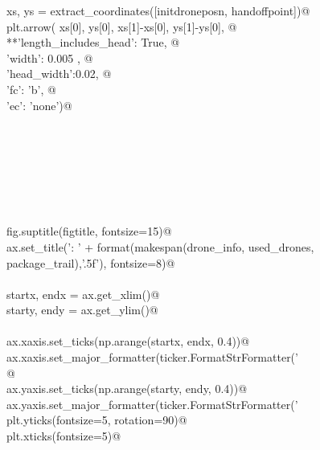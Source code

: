 \documentclass[10.0pt]{report}
\begin{document}
\begin{flushleft}
\begin{list}{}{}
\mbox{}\verb@         xs, ys = extract_coordinates([initdroneposn, handoffpoint])@\\
\mbox{}\verb@         plt.arrow( xs[0], ys[0], xs[1]-xs[0], ys[1]-ys[0], @\\
\mbox{}\verb@                    **{'length_includes_head': True, @\\
\mbox{}\verb@                       'width': 0.005 , @\\
\mbox{}\verb@                       'head_width':0.02, @\\
\mbox{}\verb@                       'fc': 'b', @\\
\mbox{}\verb@                       'ec': 'none'})@\\
\mbox{}\verb@@\\
\mbox{}\verb@@\\
\mbox{}\verb@@\\
\mbox{}\verb@@\\
\mbox{}\verb@@\\
\mbox{}\verb@@\\
\mbox{}\verb@@\\
\mbox{}\verb@    fig.suptitle(figtitle, fontsize=15)@\\
\mbox{}\verb@    ax.set_title('\nMakespan: ' + format(makespan(drone_info, used_drones, package_trail),'.5f'), fontsize=8)@\\
\mbox{}\verb@@\\
\mbox{}\verb@    startx, endx = ax.get_xlim()@\\
\mbox{}\verb@    starty, endy = ax.get_ylim()@\\
\mbox{}\verb@@\\
\mbox{}\verb@    ax.xaxis.set_ticks(np.arange(startx, endx, 0.4))@\\
\mbox{}\verb@    ax.xaxis.set_major_formatter(ticker.FormatStrFormatter('%0.1f'))@\\
\mbox{}\verb@@\\
\mbox{}\verb@     @\\
\mbox{}\verb@    ax.yaxis.set_ticks(np.arange(starty, endy, 0.4))@\\
\mbox{}\verb@    ax.yaxis.set_major_formatter(ticker.FormatStrFormatter('%0.1f'))@\\
\mbox{}\verb@@\\
\mbox{}\verb@    plt.yticks(fontsize=5, rotation=90)@\\
\mbox{}\verb@    plt.xticks(fontsize=5)@\\
\mbox{}\verb@@\\
\mbox{}\verb@@\\

\end{list}
\end{flushleft}
\end{document}
